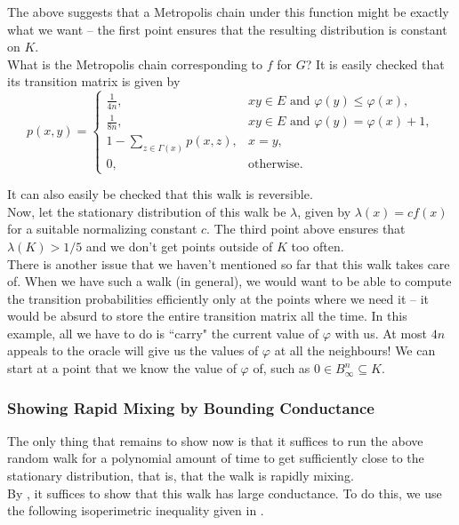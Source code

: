 The above suggests that a Metropolis chain under this function might be exactly what we want -- the first point ensures that the resulting distribution is constant on $K$.\\

What is the Metropolis chain corresponding to $f$ for $G$? It is easily checked that its transition matrix is given by
\[
p(x,y) =
\begin{cases}
\frac{1}{4n}, & xy\in E\text{ and }\varphi(y)\leq\varphi(x), \\
\frac{1}{8n}, & xy\in E\text{ and }\varphi(y)=\varphi(x)+1, \\
1-\sum_{z\in\Gamma(x)}p(x,z), & x=y, \\
0, & \text{otherwise.}
\end{cases}
\]

It can also easily be checked that this walk is reversible.\\
Now, let the stationary distribution of this walk be $\lambda$, given by $\lambda(x)=cf(x)$ for a suitable normalizing constant $c$. The third point above ensures that $\lambda(K)>1/5$ and we don't get points outside of $K$ too often.\\

There is another issue that we haven't mentioned so far that this walk takes care of. When we have such a walk (in general), we would want to be able to compute the transition probabilities efficiently only at the points where we need it -- it would be absurd to store the entire transition matrix all the time. In this example, all we have to do is ``carry" the current value of $\varphi$ with us. At most $4n$ appeals to the oracle will give us the values of $\varphi$ at all the neighbours! We can start at a point that we know the value of $\varphi$ of, such as $0\in B_\infty^n \subseteq K$.

\subsubsection{Showing Rapid Mixing by Bounding Conductance}

The only thing that remains to show now is that it suffices to run the above random walk for a polynomial amount of time to get sufficiently close to the stationary distribution, that is, that the walk is rapidly mixing.\\
By , it suffices to show that this walk has large conductance. To do this, we use the following isoperimetric inequality given in \cite{lovasz-simonovits-mixing-rate-isoperimetric}.

